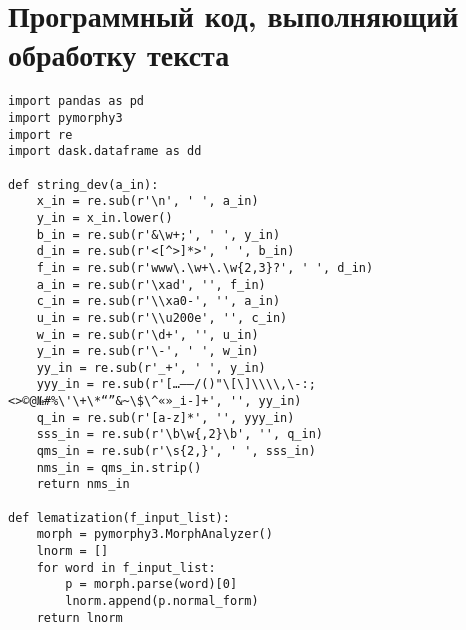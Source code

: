 \documentclass[coursework]{SCWorks}
\begin{document}
\section{Программный код, выполняющий обработку текста}
\label{apx:tokenization}
\begin{verbatim}
import pandas as pd
import pymorphy3
import re
import dask.dataframe as dd

def string_dev(a_in):
    x_in = re.sub(r'\n', ' ', a_in)
    y_in = x_in.lower()
    b_in = re.sub(r'&\w+;', ' ', y_in)
    d_in = re.sub(r'<[^>]*>', ' ', b_in)
    f_in = re.sub(r'www\.\w+\.\w{2,3}?', ' ', d_in)
    a_in = re.sub(r'\xad', '', f_in)
    c_in = re.sub(r'\\xa0-', '', a_in)
    u_in = re.sub(r'\\u200e', '', c_in)
    w_in = re.sub(r'\d+', '', u_in)
    y_in = re.sub(r'\-', ' ', w_in)
    yy_in = re.sub(r'_+', ' ', y_in)
    yyy_in = re.sub(r'[…—–/()"\[\]\\\\,\-:;<>©@№#%\'\+\*“”&~\$\^«»_і‑]+', '', yy_in)
    q_in = re.sub(r'[a-z]*', '', yyy_in)
    sss_in = re.sub(r'\b\w{,2}\b', '', q_in)
    qms_in = re.sub(r'\s{2,}', ' ', sss_in)
    nms_in = qms_in.strip()
    return nms_in

def lematization(f_input_list):
    morph = pymorphy3.MorphAnalyzer()
    lnorm = []
    for word in f_input_list:
        p = morph.parse(word)[0]
        lnorm.append(p.normal_form)
    return lnorm


\end{verbatim}
\end{document}
